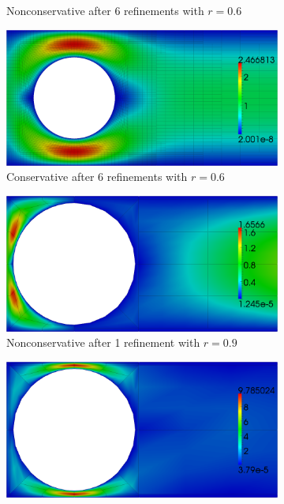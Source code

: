 \documentclass[letterpaper]{article}
\begin{document}
\begin{figure}[p]
\begin{subfigure}[t]{0.45\textwidth}
\caption{Nonconservative after 6 refinements with $r=0.6$}
\label{fig:stokesCylinder6NC6}
\end{subfigure}
\begin{subfigure}[t]{0.45\textwidth}
\centering
\includegraphics[width=\textwidth]{figs/StokesCylinder/umag6_C6.png}
\caption{Conservative after 6 refinements with $r=0.6$}
\label{fig:stokesCylinder6C6}
\end{subfigure}
\begin{subfigure}[t]{0.45\textwidth}
\centering
\includegraphics[width=\textwidth]{figs/StokesCylinder/umag9_NC1.png}
\caption{Nonconservative after 1 refinement with $r=0.9$}
\label{fig:stokesCylinder9NC1}
\end{subfigure}
\begin{subfigure}[t]{0.45\textwidth}
\centering
\includegraphics[width=\textwidth]{figs/StokesCylinder/umag9_C1.png}

\end{subfigure}
\end{figure}
\end{document}
